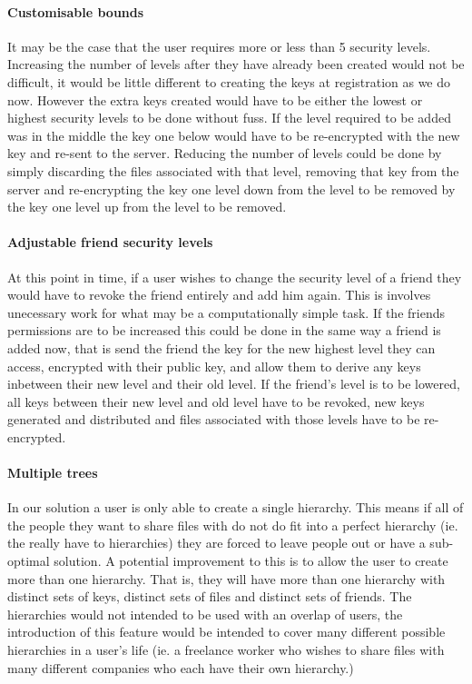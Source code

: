 \documentclass[12pt, titlepage]{article}
\begin{document}
\paragraph*{Customisable bounds} It may be the case that the user requires more or less than 5 security levels. Increasing the number of levels after they have already been created would not be difficult, it would be little different to creating the keys at registration as we do now. However the extra keys created would have to be either the lowest or highest security levels to be done without fuss. If the level required to be added was in the middle the key one below would have to be re-encrypted with the new key and re-sent to the server. Reducing the number of levels could be done by simply discarding the files associated with that level, removing that key from the server and re-encrypting the key one level down from the level to be removed by the key one level up from the level to be removed.
\paragraph*{Adjustable friend security levels} At this point in time, if a user wishes to change the security level of a friend they would have to revoke the friend entirely and add him again. This is involves unecessary work for what may be a computationally simple task. If the friends permissions are to be increased this could be done in the same way a friend is added now, that is send the friend the key for the new highest level they can access, encrypted with their public key, and allow them to derive any keys inbetween their new level and their old level. If the friend's level is to be lowered, all keys between their new level and old level have to be revoked, new keys generated and distributed and files associated with those levels have to be re-encrypted.
\paragraph*{Multiple trees} In our solution a user is only able to create a single hierarchy. This means if all of the people they want to share files with do not do fit into a perfect hierarchy (ie. the really have to hierarchies) they are forced to leave people out or have a sub-optimal solution. A potential improvement to this is to allow the user to create more than one hierarchy. That is, they will have more than one hierarchy with distinct sets of keys, distinct sets of files and distinct sets of friends. The hierarchies would not intended to be used with an overlap of users, the introduction of this feature would be intended to cover many different possible hierarchies in a user's life (ie. a freelance worker who wishes to share files with many different companies who each have their own hierarchy.)
\end{document}
